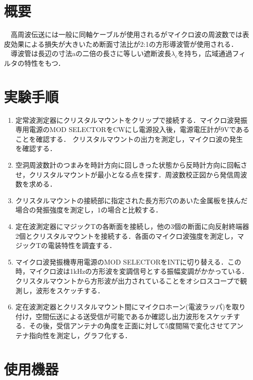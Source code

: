\section{概要}
　高周波伝送には一般に同軸ケーブルが使用されるがマイクロ波の周波数では表皮効果による損失が大きいため断面寸法比が2:1の方形導波管が使用される．
　導波管は長辺の寸法aの二倍の長さに等しい遮断波長$\lambda_c$を持ち，広域通過フィルタの特性をもつ．

\section{実験手順\label{jikken}}
\begin{enumerate}
    \item 定常波測定器にクリスタルマウントをクリップで接続する．マイクロ波発振専用電源のMOD SELECTORをCWにし電源投入後，電源電圧計が9Vであることを確認する．
    クリスタルマウントの出力を測定し，マイクロ波の発生を確認する．

    \item 空洞周波数計のつまみを時計方向に回しきった状態から反時計方向に回転させ，クリスタルマウントが最小となる点を探す．周波数校正図から発信周波数を求める．
    \item クリスタルマウントの接続部に指定された長方形穴のあいた金属板を挟んだ場合の発振強度を測定し，1の場合と比較する．

    \item 定在波測定器にマジックTの各断面を接続し，他の3個の断面に向反射終端器2個とクリスタルマウントを接続する．各面のマイクロ波強度を測定し，マジックTの電装特性を調査する．

    \item マイクロ波発振機専用電源のMOD SELECTORをINTに切り替える．この時，マイクロ波は1kHzの方形波を変調信号とする振幅変調がかかっている．クリスタルマウントから方形波が出力されていることをオシロスコープで観測し，波形をスケッチする．

    \item 定在波測定器とクリスタルマウント間にマイクロホーン(電波ラッパ)を取り付け，空間伝送による送受信が可能であるか確認し出力波形をスケッチする．その後，受信アンテナの角度を正面に対して5度間隔で変化させてアンテナ指向性を測定し，グラフ化する．
  \end{enumerate}

  \newpage

  \section{使用機器\label{kiki}}
